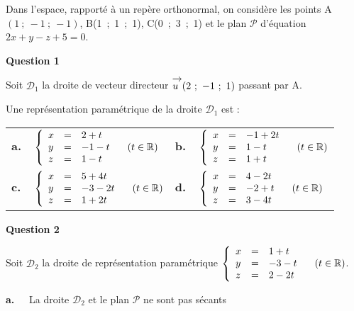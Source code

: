 \documentclass[10pt]{article}
\newcommand{\R}{\mathbb{R}}
\newcommand{\vect}[1]{\mathchoice%
{\overrightarrow{\displaystyle\mathstrut#1\,\,}}%
{\overrightarrow{\textstyle\mathstrut#1\,\,}}%
{\overrightarrow{\scriptstyle\mathstrut#1\,\,}}%
{\overrightarrow{\scriptscriptstyle\mathstrut#1\,\,}}}
\begin{document}
\smallskip
{}
Dans l'espace, rapporté à un repère orthonormal, on considère les points A$(1~;~- 1~;~- 1)$, B(1~;~1~;~1), C(0~;~3~;~1) et le plan $\mathcal{P}$ d'équation $2x + y - z + 5 = 0$. 

\medskip

\textbf{Question  1}
 
Soit $\mathcal{D}_{1}$ la droite de vecteur directeur $\vect{u}(2~;~-1~;~1)$ passant par A.
 
Une représentation  paramétrique de la droite $\mathcal{D}_{1}$ est :


\medskip
\begin{tabularx}{\linewidth}{X X}
\textbf{a.~~}$\left\{\begin{array}{l cl}
x&=&2+t \\
y&=&- 1 - t\\ 
z&=&1 - t
\end{array}\right. \quad (t \in \R)$&
\textbf{b.~~}$\left\{\begin{array}{l cl}
x&=&- 1 + 2t \\
y&=&1 - t\\ 
z&=&1 + t
\end{array}\right. \quad (t \in \R)$\\
\textbf{c.~~}$\left\{\begin{array}{l cl}
x&=&5 + 4t \\
y&=&- 3 - 2t\\ 
z&=&1 +  2t
\end{array}\right. \quad (t \in \R)$&
\textbf{d.~~}$\left\{\begin{array}{l cl}
x&=&4 -  2t \\
y&=&- 2 + t\\ 
z&=&3 - 4 t
\end{array}\right. \quad (t \in \R)$\\
\end{tabularx}
\medskip
 
\textbf{Question 2}

Soit $\mathcal{D}_{2}$ la droite de représentation paramétrique $\left\{\begin{array}{l cl}
x&=&1 +  t \\
y&=&- 3 - t\\ 
z&=&2 - 2 t
\end{array}\right. \quad (t \in \R)$.
 
\textbf{a.~~} La droite $\mathcal{D}_{2}$ et le plan $\mathcal{P}$ ne sont pas sécants 
\end{document}
